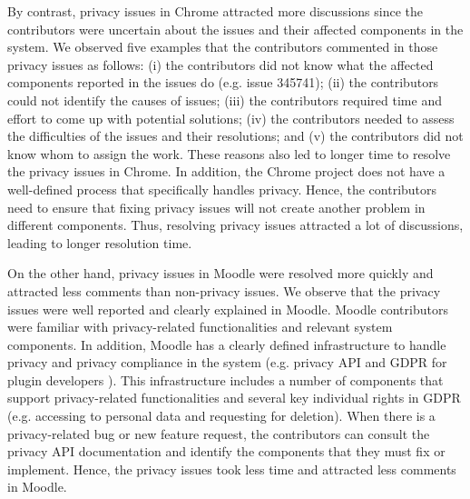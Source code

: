 By contrast, privacy issues in Chrome attracted more discussions since the contributors were uncertain about the issues and their affected components in the system. We observed five examples that the contributors commented in those privacy issues as follows: (i) the contributors did not know what the affected components reported in the issues do (e.g. issue 345741); (ii) the contributors could not identify the causes of issues; (iii) the contributors required time and effort to come up with potential solutions; (iv) the contributors needed to assess the difficulties of the issues and their resolutions; and (v) the contributors did not know whom to assign the work. These reasons also led to longer time to resolve the privacy issues in Chrome. In addition, the Chrome project does not have a well-defined process that specifically handles privacy. Hence, the contributors need to ensure that fixing privacy issues will not create another problem in different components. Thus, resolving privacy issues attracted a lot of discussions, leading to longer resolution time.

On the other hand, privacy issues in Moodle were resolved more quickly and attracted less comments than non-privacy issues. We observe that the privacy issues were well reported and clearly explained in Moodle. Moodle contributors were familiar with privacy-related functionalities and relevant system components. In addition, Moodle has a clearly defined infrastructure to handle privacy and privacy compliance in the system (e.g. privacy API \cite{Moodle2019} and GDPR for plugin developers \cite{Nicols2018}). This infrastructure includes a number of components that support privacy-related functionalities and several key individual rights in GDPR (e.g. accessing to personal data and requesting for deletion). When there is a privacy-related bug or new feature request, the contributors can consult the privacy API documentation and identify the components that they must fix or implement. Hence, the privacy issues took less time and attracted less comments in Moodle.


